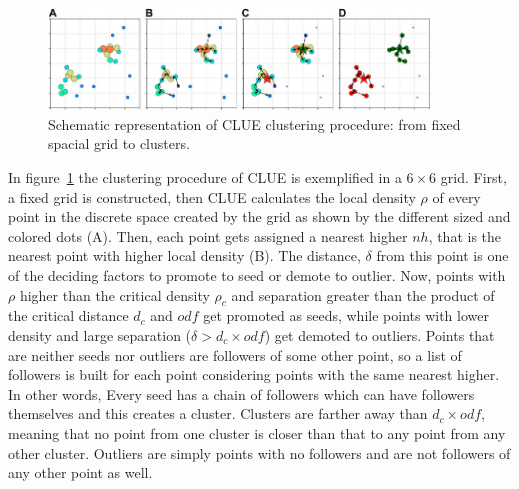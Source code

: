 \begin{figure}[ht]
    \centering
    \includegraphics[width=0.9\textwidth]{media/clustering_procedure.jpg}
    \caption{Schematic representation of CLUE clustering procedure: from fixed spacial grid to clusters.}
    \label{fig:clustering_procedure}
\end{figure}

In figure~\ref{fig:clustering_procedure} the clustering procedure of CLUE is exemplified in a $6\times6$ grid. First, a fixed grid is constructed, then CLUE calculates the local density $\rho$ of every point in the discrete space created by the grid as shown by the different sized and colored dots (A). Then, each point gets assigned a nearest higher $nh$, that is the nearest point with higher local density (B). The distance, $\delta$ from this point is one of the deciding factors to promote to seed or demote to outlier. Now, points with $\rho$ higher than the critical density $\rho_c$ and separation greater than the product of the critical distance $d_c$ and $odf$ get promoted as seeds, while points with lower density and large separation ($\delta > d_c \times odf$) get demoted to outliers. Points that are neither seeds nor outliers are followers of some other point, so a list of followers is built for each point considering points with the same nearest higher. In other words, Every seed has a chain of followers which can have followers themselves and this creates a cluster. Clusters are farther away than $d_c \times odf$, meaning that no point from one cluster is closer than that to any point from any other cluster. Outliers are simply points with no followers and are not followers of any other point as well.

